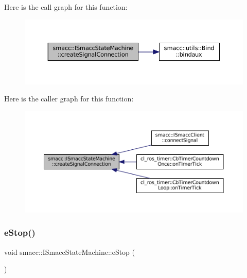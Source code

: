 Here is the call graph for this function\+:
\nopagebreak
\begin{figure}[H]
\begin{center}
\leavevmode
\includegraphics[width=350pt]{classsmacc_1_1ISmaccStateMachine_adf0f42ade0c65cc471960fe2a7c42da2_cgraph}
\end{center}
\end{figure}
Here is the caller graph for this function\+:
\nopagebreak
\begin{figure}[H]
\begin{center}
\leavevmode
\includegraphics[width=350pt]{classsmacc_1_1ISmaccStateMachine_adf0f42ade0c65cc471960fe2a7c42da2_icgraph}
\end{center}
\end{figure}
\mbox{\label{classsmacc_1_1ISmaccStateMachine_a66a2900be8629748dab7a5c5ab6ae94e}} 
\subsubsection{\texorpdfstring{e\+Stop()}{eStop()}}
{\footnotesize\ttfamily void smacc\+::\+I\+Smacc\+State\+Machine\+::e\+Stop (\begin{DoxyParamCaption}{ }\end{DoxyParamCaption})\hspace{0.3cm}{\ttfamily [virtual]}}



